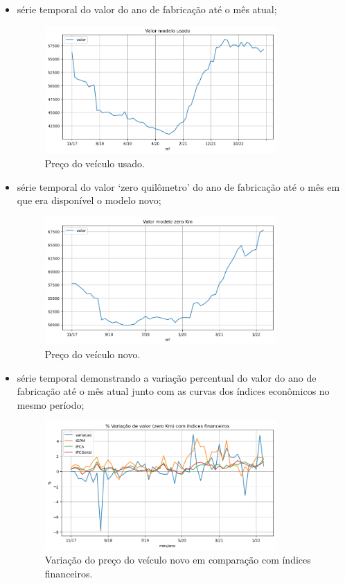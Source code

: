 \documentclass[conference]{IEEEtran}
\begin{document}
\begin{itemize}
	\item série temporal do valor do ano de fabricação até o mês atual;
	
	\begin{figure}[h!]
		\centerline{\includegraphics[width=250pt]{assets/precoUsado.png}}
		\caption{Preço do veículo usado.}
		\label{fig3}
	\end{figure}

	\item série temporal do valor `zero quilômetro' do ano de fabricação até o mês em que era disponível o modelo novo;
	
	
	\begin{figure}[h!]
		\centerline{\includegraphics[width=250pt]{assets/precoZero.png}}
		\caption{Preço do veículo novo.}
		\label{fig4}
	\end{figure}
	
	
	\item série temporal demonstrando a variação percentual do valor do ano de fabricação até o mês atual junto com as curvas dos índices econômicos no mesmo período;
	
	
	\begin{figure}[h!]
		\centerline{\includegraphics[width=250pt]{assets/varZero.png}}
		\caption{Variação do preço do veículo novo em comparação com índices financeiros.}
		\label{fig5}
	\end{figure}
	

\end{itemize}
\end{document}
